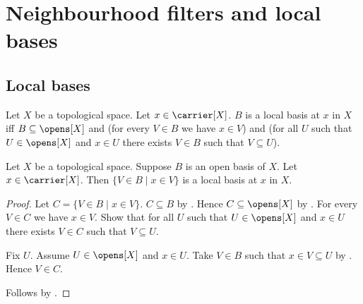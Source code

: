 \section{Neighbourhood filters and local bases}







\subsection{Local bases}

\begin{definition}\label{local_basis}
    Let $X$ be a topological space.
    Let $x\in\carrier[X]$.
    $B$ is a local basis at $x$ in $X$ iff
        $B\subseteq\opens[X]$ and
        (for every $V\in B$ we have $x\in V$) and
        (for all $U$ such that $U\in\opens[X]$ and $x\in U$
            there exists $V\in B$ such that $V\subseteq U$).
\end{definition}

\begin{theorem}\label{open_basis_point_slice_is_local_basis}
    Let $X$ be a topological space.
    Suppose $B$ is an open basis of $X$.
    Let $x\in\carrier[X]$.
    Then $\{V\in B\mid x\in V\}$ is a local basis at $x$ in $X$.
\end{theorem}
\begin{proof}
    Let $C=\{V\in B\mid x\in V\}$.
    $C\subseteq B$ by .
    Hence $C\subseteq\opens[X]$
        by .
    For every $V\in C$ we have $x\in V$.
    Show that for all $U$ such that $U\in\opens[X]$ and $x\in U$
        there exists $V\in C$ such that $V\subseteq U$.
    \begin{subproof}
        Fix $U$.
        Assume $U\in\opens[X]$ and $x\in U$.
        Take $V\in B$ such that $x\in V\subseteq U$
            by .
        Hence $V\in C$.
    \end{subproof}
    Follows by .
\end{proof}

